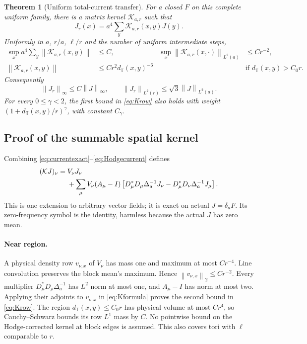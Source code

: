 \documentclass[11pt,letterpaper]{article}
\numberwithin{equation}{section}
\newtheorem{theorem}{Theorem}[section]
\theoremstyle{definition}\newtheorem{definition}[theorem]{Definition}
\theoremstyle{remark}\newtheorem{remark}[theorem]{Remark}
\newcommand{\norm}[1]{\left\lVert #1\right\rVert}
\newcommand{\Kern}{\mathcal K}
\begin{document}
\begin{theorem}[Uniform total-current transfer]
\label{thm:current}
For a closed $F$ on this complete uniform family, there is a matrix kernel $\Kern_{a,r}$ such that
\[
 J_r(x)=a^4\sum_y\Kern_{a,r}(x,y)J(y).
\]
Uniformly in $a$, $r/a$, $\ell/r$ and the number of uniform intermediate steps,
\begin{align}
 \sup_xa^4\sum_y\norm{\Kern_{a,r}(x,y)}&\le C,
 &\sup_x\norm{\Kern_{a,r}(x,\cdot)}_{L^2(a)}&\le Cr^{-2},
 \label{eq:Krow}\\
 \norm{\Kern_{a,r}(x,y)}&\le Cr^2d_{\mathbb T}(x,y)^{-6}
 &&\text{if }d_{\mathbb T}(x,y)>C_0r.
 \label{eq:Ktail}
\end{align}
Consequently
\begin{equation}
 \norm{J_r}_\infty\le C\norm J_\infty,\qquad
 \norm{J_r}_{L^2(r)}\le\sqrt3\norm J_{L^2(a)}.
 \label{eq:currentbounds}
\end{equation}
For every $0\le\gamma<2$, the first bound in \eqref{eq:Krow} also holds with weight $(1+d_{\mathbb T}(x,y)/r)^\gamma$, with constant $C_\gamma$.
\end{theorem}

\subsection{Proof of the summable spatial kernel}

Combining \eqref{eq:currentexact}--\eqref{eq:Hodgecurrent} defines
\begin{align}
 (\Kern J)_\nu={}&V_\nu J_\nu\notag\\
 &+\sum_\mu V_\nu(A_\mu-I)
 \left[D_\mu^*D_\mu\Delta_a^{-1}J_\nu
       -D_\mu^*D_\nu\Delta_a^{-1}J_\mu\right].
 \label{eq:Kformula}
\end{align}
This is one extension to arbitrary vector fields; it is exact on actual $J=\delta_aF$. Its zero-frequency symbol is the identity, harmless because the actual $J$ has zero mean.

\paragraph{Near region.}
A physical density row $v_{\nu,x}$ of $V_\nu$ has mass one and maximum at most $Cr^{-4}$. Line convolution preserves the block mean's maximum. Hence $\norm{v_{\nu,x}}_2\le Cr^{-2}$. Every multiplier $D_\mu^*D_\rho\Delta_a^{-1}$ has $L^2$ norm at most one, and $A_\mu-I$ has norm at most two. Applying their adjoints to $v_{\nu,x}$ in \eqref{eq:Kformula} proves the second bound in \eqref{eq:Krow}. The region $d_{\mathbb T}(x,y)\le C_0r$ has physical volume at most $Cr^4$, so Cauchy--Schwarz bounds its row $L^1$ mass by $C$. No pointwise bound on the Hodge-corrected kernel at block edges is assumed. This also covers tori with $\ell$ comparable to $r$.
\end{document}
